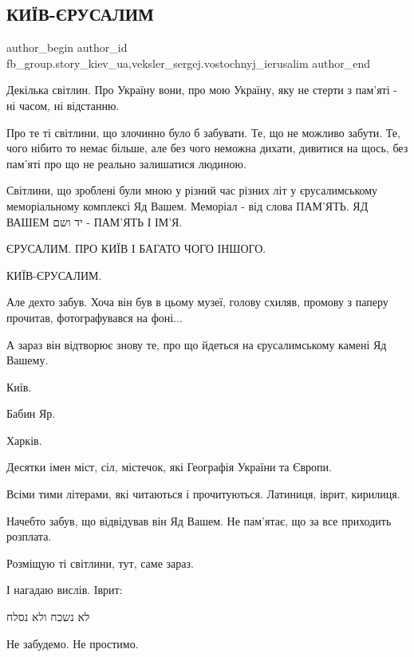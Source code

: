  
 
 
 
 
 
\subsection{КИЇВ-ЄРУСАЛИМ}
\label{sec:06_03_2022.fb.fb_group.story_kiev_ua.1.kiev_jerusalim}
 
\ifcmt
 author_begin
   author_id fb_group.story_kiev_ua,veksler_sergej.vostochnyj_ierusalim
 author_end
\fi

Декілька світлин. Про Україну вони, про мою Україну, яку не стерти з пам'яті -
ні часом, ні відстанню.


Про те ті світлини, що злочинно було б забувати. Те, що не можливо забути. Те,
чого нібито то немає більше, але без чого неможна дихати, дивитися на щось, без
пам'яті про що не реально залишатися людиною.


Світлини, що зроблені були мною у різний час різних літ у єрусалимському
меморіальному комплексі Яд Вашем. Меморіал - від слова ПАМ'ЯТЬ. ЯД ВАШЕМ יד ושם
- ПАМ'ЯТЬ І ІМ'Я.


ЄРУСАЛИМ. ПРО КИЇВ І БАГАТО ЧОГО ІНШОГО. 

КИЇВ-ЄРУСАЛИМ.

Але дехто забув. Хоча він був в цьому музеї, голову схиляв, промову з паперу
прочитав, фотографувався на фоні... 

А зараз він відтворює знову те, про що йдеться на єрусалимському камені Яд
Вашему. 

Київ.

Бабин Яр.

Харків. 

Десятки імен міст, сіл, містечок, які Географія України та Європи.

Всіми тими літерами, які читаються і прочитуються. Латиниця, іврит, кирилиця.

Начебто забув, що відвідував він Яд Вашем. Не пам'ятає, що за все приходить
розплата.

Розміщую ті світлини, тут, саме зараз.

І нагадаю вислів. Іврит:

לא נשכח ולא נסלח

Не забудемо. Не простимо.

